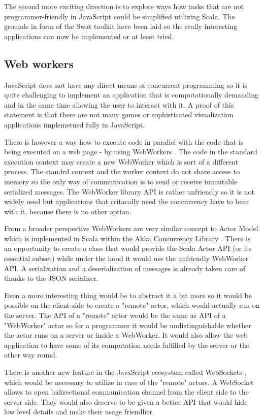 \documentclass[12pt,a4paper]{report}
\begin{document}
The second more exciting direction is to explore ways how tasks that are not programmer-friendly in JavaScript could be simplified utilizing Scala. The grounds in form of the Swat toolkit have been laid so the really interesting applications can now be implemented or at least tried.

\subsection{Web workers}

JavaScript does not have any direct means of concurrent programming so it is quite challenging to implement an application that is computationally demanding and in the same time allowing the user to interact with it. A proof of this statement is that there are not many games or sophisticated visualization applications implemetned fully in JavaScript.

There is however a way how to execute code in parallel with the code that is being executed on a web page - by using WebWorkers \cite{WebWorkers}. The code in the standard execution context may create a new WebWorker which is sort of a different process. The standrd context and the worker context do not share access to memory so the only way of communication is to send or receive immutable serialized messages. The WebWorker library API is rather unfriendly so it is not widely used but applications that critacally need the concurrency have to bear with it, because there is no other option.

From a broader perspective WebWorkers are very similar concept to Actor Model \cite{Actors} which is implemented in Scala within the Akka Concurrency Library \cite{Akka}. There is an opportunity to create a class that would provide the Scala Actor API (or its essential subset) while under the hood it would use the unfriendly WebWorker API. A serialization and a deserialization of messages is already taken care of thanks to the JSON serializer. 

Even a more interesting thing would be to abstract it a bit more so it would be possible on the client-side to create a "remote" actor, which would actually run on the server. The API of a "remote" actor would be the same as API of a "WebWorker" actor so for a programmer it would be undistinguishable whether the actor runs on a server or inside a WebWorker. It would also allow the web application to have some of its computation needs fulfilled by the server or the other way round.

There is another new feature in the JavaScript ecosystem called WebSockets \cite{WebSockets}, which would be necessary to utilize in case of the "remote" actors. A WebSocket allows to open bidirectional communication channel from the client side to the server side. They would also deserve to be given a better API that would hide low level details and make their usage friendlier.
\end{document}
